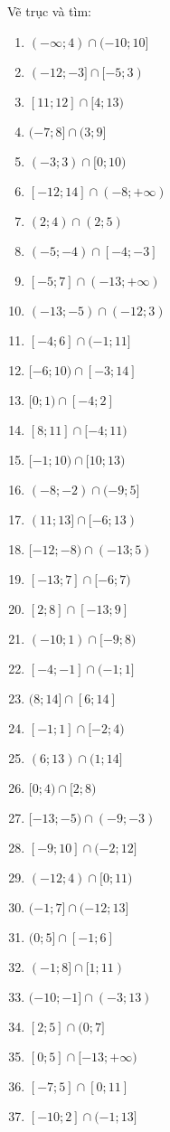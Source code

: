 \documentclass[12pt,a4paper]{article}
\begin{document}
\begin{ex}
	Vẽ trục và tìm:
	\begin{enumerate}
		\item $(-\infty;4)\cap(-10;10]$
		\item $(-12;-3]\cap[-5;3)$
		\item $[11;12]\cap[4;13)$
		\item $(-7;8]\cap(3;9]$
		\item $(-3;3)\cap[0;10)$
		\item $[-12;14]\cap(-8;+ \infty)$
		\item $(2;4)\cap(2;5)$
		\item $(-5;-4)\cap[-4;-3]$
		\item $[-5;7]\cap(-13;+ \infty)$
		\item $(-13;-5)\cap(-12;3)$
		\item $[-4;6]\cap(-1;11]$
		\item $[-6;10)\cap[-3;14]$
		\item $[0;1)\cap[-4;2]$
		\item $[8;11]\cap[-4;11)$
		\item $[-1;10)\cap[10;13)$
		\item $(-8;-2)\cap(-9;5]$
		\item $(11;13]\cap[-6;13)$
		\item $[-12;-8)\cap(-13;5)$
		\item $[-13;7]\cap[-6;7)$
		\item $[2;8]\cap[-13;9]$
		\item $(-10;1)\cap[-9;8)$
		\item $[-4;-1]\cap(-1;1]$
		\item $(8;14]\cap[6;14]$
		\item $[-1;1]\cap[-2;4)$
		\item $(6;13)\cap(1;14]$
		\item $[0;4)\cap[2;8)$
		\item $[-13;-5)\cap(-9;-3)$
		\item $[-9;10]\cap(-2;12]$
		\item $(-12;4)\cap[0;11)$
		\item $(-1;7]\cap(-12;13]$
		\item $(0;5]\cap[-1;6]$
		\item $(-1;8]\cap[1;11)$
		\item $(-10;-1]\cap(-3;13)$
		\item $[2;5]\cap(0;7]$
		\item $[0;5]\cap[-13;+ \infty)$
		\item $[-7;5]\cap[0;11]$
		\item $[-10;2]\cap(-1;13]$

\end{enumerate}
\end{ex}
\end{document}
